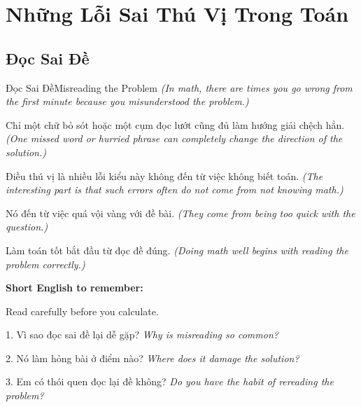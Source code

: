 \chapter{Những Lỗi Sai Thú Vị Trong Toán}

\section{Đọc Sai Đề}
\begin{truyen}{Đọc Sai Đề}{Misreading the Problem}
\textit{(In math, there are times you go wrong from the first minute because you misunderstood the problem.)}

Chỉ một chữ bỏ sót hoặc một cụm đọc lướt cũng đủ làm hướng giải chệch hẳn.
\textit{(One missed word or hurried phrase can completely change the direction of the solution.)}

Điều thú vị là nhiều lỗi kiểu này không đến từ việc không biết toán.
\textit{(The interesting part is that such errors often do not come from not knowing math.)}

Nó đến từ việc quá vội vàng với đề bài.
\textit{(They come from being too quick with the question.)}
\end{truyen}

\begin{baihoc}
Làm toán tốt bắt đầu từ đọc đề đúng.
\textit{(Doing math well begins with reading the problem correctly.)}
\end{baihoc}

\begin{ghinhoanh}
\textbf{Short English to remember:}

Read carefully before you calculate.

\end{ghinhoanh}

\begin{tuhocnhanh}
1. Vì sao đọc sai đề lại dễ gặp? \textit{Why is misreading so common?}

2. Nó làm hỏng bài ở điểm nào? \textit{Where does it damage the solution?}

3. Em có thói quen đọc lại đề không? \textit{Do you have the habit of rereading the problem?}
\end{tuhocnhanh}
\ngancach

